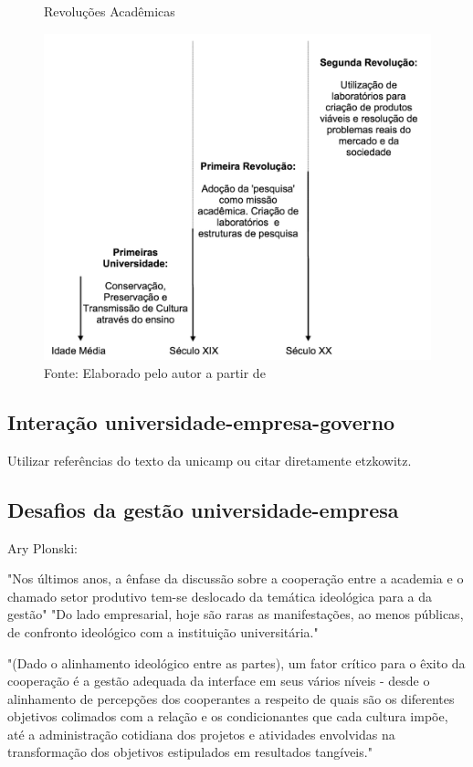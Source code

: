 \begin{figure}
\caption{Revoluções Acadêmicas}
\centerline{\includegraphics[scale=0.5]{img/academic_revolutions}}
\label{fig:academic_revolutions}
\caption* {Fonte: Elaborado pelo autor a partir de }
\end{figure}


\subsection{Interação universidade-empresa-governo}
\label{cha:univ_empreend}

Utilizar referências do texto da unicamp ou citar diretamente etzkowitz.

\subsection{Desafios da gestão universidade-empresa}
\label{cha:univ_empreend}

Ary Plonski:

"Nos últimos anos, a ênfase da discussão sobre a cooperação entre a academia e o chamado setor produtivo tem-se deslocado da temática ideológica para a da gestão"
"Do lado empresarial, hoje são raras as manifestações, ao menos públicas, de confronto ideológico com a instituição universitária."

"(Dado o alinhamento ideológico entre as partes), um fator crítico para o êxito da cooperação é a gestão adequada da interface em seus vários níveis - desde o alinhamento de percepções dos cooperantes a respeito de quais são os diferentes objetivos colimados com a relação e os condicionantes que cada cultura impõe, até a administração cotidiana dos projetos e atividades envolvidas na transformação dos objetivos estipulados em resultados tangíveis."

